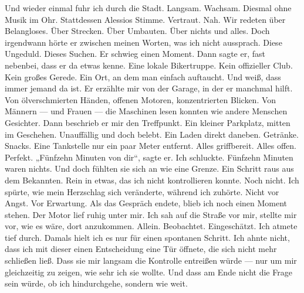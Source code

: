 Und wieder einmal fuhr ich durch die Stadt.
Langsam. Wachsam.
Diesmal ohne Musik im Ohr. Stattdessen Alessios Stimme. Vertraut. Nah.
Wir redeten über Belangloses. Über Strecken. Über Umbauten. Über nichts und alles.
Doch irgendwann hörte er zwischen meinen Worten, was ich nicht aussprach. Diese Ungeduld. Dieses Suchen.
Er schwieg einen Moment.
Dann sagte er, fast nebenbei, dass er da etwas kenne.
Eine lokale Bikertruppe. Kein offizieller Club. Kein großes Gerede.
Ein Ort, an dem man einfach auftaucht. Und weiß, dass immer jemand da ist.
Er erzählte mir von der Garage, in der er manchmal hilft. Von ölverschmierten Händen, offenen Motoren, konzentrierten Blicken. Von Männern — und Frauen — die Maschinen lesen konnten wie andere Menschen Gesichter.
Dann beschrieb er mir den Treffpunkt.
Ein kleiner Parkplatz, mitten im Geschehen. Unauffällig und doch belebt.
Ein Laden direkt daneben. Getränke. Snacks.
Eine Tankstelle nur ein paar Meter entfernt.
Alles griffbereit. Alles offen.
Perfekt.
„Fünfzehn Minuten von dir“, sagte er.
Ich schluckte.
Fünfzehn Minuten waren nichts. Und doch fühlten sie sich an wie eine Grenze.
Ein Schritt raus aus dem Bekannten. Rein in etwas, das ich nicht kontrollieren konnte. Noch nicht.
Ich spürte, wie mein Herzschlag sich veränderte, während ich zuhörte.
Nicht vor Angst.
Vor Erwartung.
Als das Gespräch endete, blieb ich noch einen Moment stehen. Der Motor lief ruhig unter mir.
Ich sah auf die Straße vor mir, stellte mir vor, wie es wäre, dort anzukommen.
Allein. Beobachtet. Eingeschätzt.
Ich atmete tief durch.
Damals hielt ich es nur für einen spontanen Schritt.
Ich ahnte nicht, dass ich mit dieser einen Entscheidung eine Tür öffnete, die sich nicht mehr schließen ließ.
Dass sie mir langsam die Kontrolle entreißen würde —
nur um mir gleichzeitig zu zeigen, wie sehr ich sie wollte.
Und dass am Ende nicht die Frage sein würde, ob ich hindurchgehe,
sondern wie weit.

